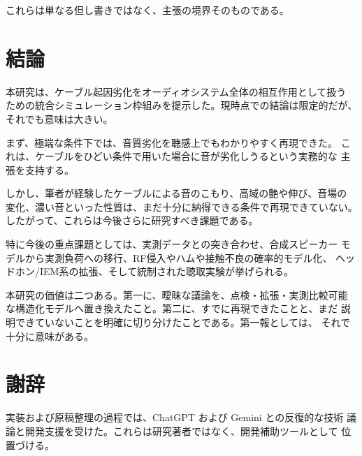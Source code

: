 \documentclass[a4paper,11pt]{ltjsarticle}
\begin{document}
これらは単なる但し書きではなく、主張の境界そのものである。

\section{結論}

本研究は、ケーブル起因劣化をオーディオシステム全体の相互作用として扱う
ための統合シミュレーション枠組みを提示した。現時点での結論は限定的だが、
それでも意味は大きい。

まず、極端な条件下では、音質劣化を聴感上でもわかりやすく再現できた。
これは、ケーブルをひどい条件で用いた場合に音が劣化しうるという実務的な
主張を支持する。

しかし、筆者が経験したケーブルによる音のこもり、高域の艶や伸び、音場の
変化、濃い音といった性質は、まだ十分に納得できる条件で再現できていない。
したがって、これらは今後さらに研究すべき課題である。

特に今後の重点課題としては、実測データとの突き合わせ、合成スピーカー
モデルから実測負荷への移行、RF侵入やハムや接触不良の確率的モデル化、
ヘッドホン/IEM系の拡張、そして統制された聴取実験が挙げられる。

本研究の価値は二つある。第一に、曖昧な議論を、点検・拡張・実測比較可能
な構造化モデルへ置き換えたこと。第二に、すでに再現できたことと、まだ
説明できていないことを明確に切り分けたことである。第一報としては、
それで十分に意味がある。

\section*{謝辞}

実装および原稿整理の過程では、ChatGPT および Gemini との反復的な技術
議論と開発支援を受けた。これらは研究著者ではなく、開発補助ツールとして
位置づける。
\end{document}
